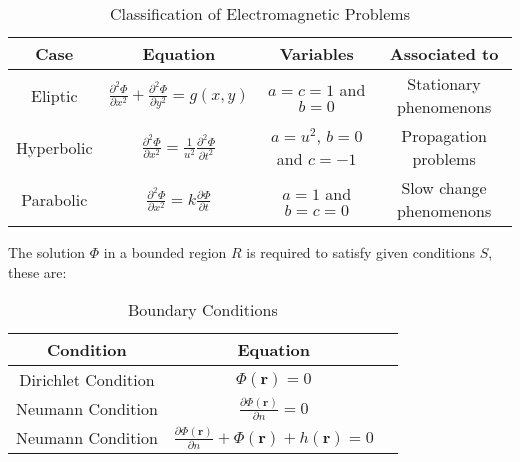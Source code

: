 \documentclass[12pt]{article}
\begin{document}
\begin{table}[htpb]
	\centering
	\caption{Classification of Electromagnetic Problems}
	\label{tab:label}
	\begin{tabular}{cccc}
		\toprule
		Case       & Equation                                                                                             & Variables                   & Associated to           \\
		\midrule
		Eliptic    & $\frac{\partial^{2}\Phi}{\partial x^{2}} + \frac{\partial^{2}\Phi}{\partial y^{2}} = g(x,y) $        & $a=c=1$ and $b=0$           & Stationary  phenomenons \\
		Hyperbolic & $\frac{\partial^{2}\Phi}{\partial x^{2}} = \frac{1}{u^{2}} \frac{\partial^{2}\Phi}{\partial t^{2}} $ & $a=u^{2}$, $b=0$ and $c=-1$ & Propagation problems    \\
		Parabolic  & $\frac{\partial^{2}\Phi}{\partial x^{2}} =k \frac{\partial\Phi}{\partial t}$                         & $a=1$ and $b=c=0$           & Slow change phenomenons \\
		\bottomrule
	\end{tabular}
\end{table}

The solution $\Phi$ in a bounded region  $R$ is required to satisfy given conditions  $S$, these are:

\begin{table}[htpb]
	\centering
	\caption{Boundary Conditions}
	\label{tab:boundary_conditions}
	\begin{tabular}{ccc}
		\toprule
		Condition           & Equation                                                                   \\
		\midrule
		Dirichlet Condition & $\Phi(\bm{r}) = 0$                                                         \\
		Neumann Condition   & $\frac{\partial \Phi(\bm{r})}{\partial n} = 0$                             \\
		Neumann Condition   & $\frac{\partial \Phi(\bm{r})}{\partial n} +  \Phi(\bm{r}) + h(\bm{r}) = 0$ \\
		\bottomrule
	\end{tabular}
\end{table}
\end{document}
